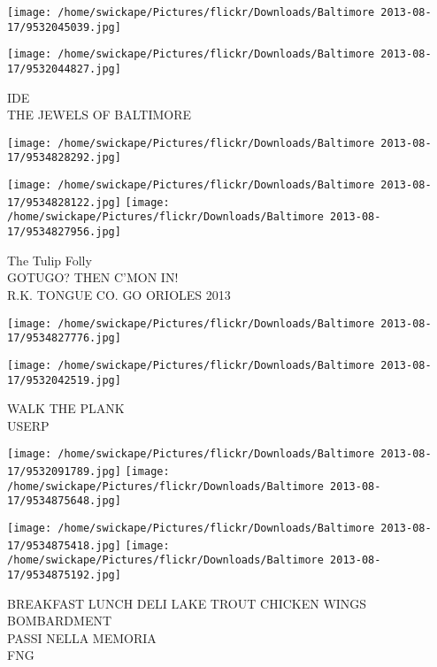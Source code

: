 \documentclass[10pt,letterpaper]{article}
\begin{document}
\texttt{[image: /home/swickape/Pictures/flickr/Downloads/Baltimore 2013-08-17/9532045039.jpg]}

\vspace{0.25in}
\texttt{[image: /home/swickape/Pictures/flickr/Downloads/Baltimore 2013-08-17/9532044827.jpg]}

IDE\\
THE JEWELS OF BALTIMORE\\
\pagebreak

\texttt{[image: /home/swickape/Pictures/flickr/Downloads/Baltimore 2013-08-17/9534828292.jpg]}

\vspace{0.25in}
\texttt{[image: /home/swickape/Pictures/flickr/Downloads/Baltimore 2013-08-17/9534828122.jpg]}
\texttt{[image: /home/swickape/Pictures/flickr/Downloads/Baltimore 2013-08-17/9534827956.jpg]}

The Tulip Folly\\
GOTUGO? THEN C'MON IN!\\
R.K. TONGUE CO. GO ORIOLES 2013\\
\pagebreak

\texttt{[image: /home/swickape/Pictures/flickr/Downloads/Baltimore 2013-08-17/9534827776.jpg]}

\vspace{0.25in}
\texttt{[image: /home/swickape/Pictures/flickr/Downloads/Baltimore 2013-08-17/9532042519.jpg]}

WALK THE PLANK\\
USERP\\
\pagebreak

\texttt{[image: /home/swickape/Pictures/flickr/Downloads/Baltimore 2013-08-17/9532091789.jpg]}
\texttt{[image: /home/swickape/Pictures/flickr/Downloads/Baltimore 2013-08-17/9534875648.jpg]}

\texttt{[image: /home/swickape/Pictures/flickr/Downloads/Baltimore 2013-08-17/9534875418.jpg]}
\texttt{[image: /home/swickape/Pictures/flickr/Downloads/Baltimore 2013-08-17/9534875192.jpg]}

BREAKFAST LUNCH DELI LAKE TROUT CHICKEN WINGS\\
BOMBARDMENT\\
PASSI NELLA MEMORIA\\
FNG\\
\pagebreak
\end{document}
